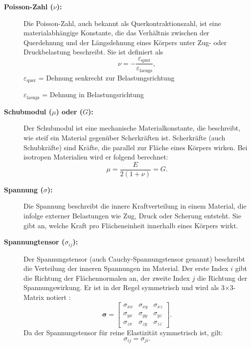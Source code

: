 \begin{description}
\item[\textbf{Poisson-Zahl ($\nu$):}] Die Poisson-Zahl, auch bekannt als Querkontraktionszahl, ist eine materialabhängige Konstante, die das Verhältnis zwischen der Querdehnung und der Längsdehnung eines Körpers unter Zug- oder Druckbelastung beschreibt.
Sie ist definiert als
	\begin{equation*}
		\nu=
		-\frac{\varepsilon_\text{quer}}{\varepsilon_\text{laengs}},
	\end{equation*}
	$\varepsilon_\text{quer}$ = Dehnung senkrecht zur Belastungsrichtung
	
	$\varepsilon_\text{laengs}$ = Dehnung in Belastungsrichtung
	
\item[\textbf{Schubmodul ($\mu$) oder ($G$):}] Der Schubmodul ist eine mechanische Materialkonstante, die beschreibt, wie steif ein Material gegenüber Scherkräften ist.
Scherkräfte (auch Schubkräfte) sind Kräfte, die parallel zur Fläche eines Körpers wirken. 
Bei isotropen Materialien wird er folgend berechnet:
	\begin{equation*}
		\mu = 
		\frac{E}{2(1 + \nu)} =
		G.
	\end{equation*}
\item[\textbf{Spannung ($\sigma$):}] Die Spannung beschreibt die innere Kraftverteilung in einem Material, die infolge externer Belastungen wie Zug, Druck oder Scherung entsteht. 
Sie gibt an, welche Kraft pro Flächeneinheit innerhalb eines Körpers wirkt.
	
\item[\textbf{Spannungtensor ($\sigma_{ij}$):}] Der Spannungstensor (auch Cauchy-Spannungstensor genannt) beschreibt die Verteilung der inneren Spannungen im Material. 
Der erste Index	$i$ gibt die Richtung der Flächennormalen an, der zweite Index $j$ die Richtung der Spannungswirkung. 
Er ist in der Regel symmetrisch und wird als 3×3-Matrix notiert \cite{elastomechanik:Grundlagen_der_Elastizitaetstheorie}:
	\begin{equation*}
		\boldsymbol{\sigma} =
		\begin{bmatrix}
			\sigma_{xx} & \sigma_{xy} & \sigma_{xz} \\
			\sigma_{yx} & \sigma_{yy} & \sigma_{yz} \\
			\sigma_{zx} & \sigma_{zy} & \sigma_{zz}
		\end{bmatrix}.
	\end{equation*}
Da der Spannungstensor für reine Elastizität symmetrisch ist, gilt:
	\begin{equation*}
		\sigma_{ij} = 
		\sigma_{ji}.
	\end{equation*}
	

\end{description}
